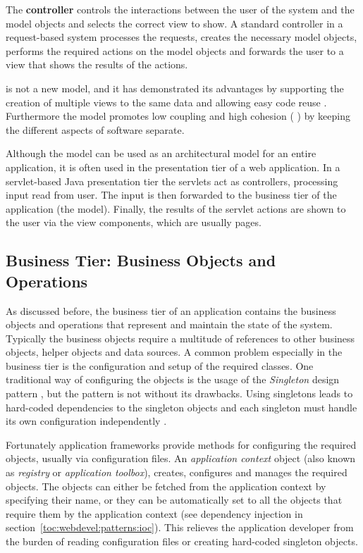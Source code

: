 The \textbf{controller} controls the interactions between the user of 
the system and the model objects and selects the correct view to show. 
A standard controller in a request-based system processes the 
requests, creates the necessary model objects, performs the required 
actions on the model objects and forwards the user to a view that 
shows the results of the actions.

 is not a new model, and it has demonstrated its 
advantages by supporting the creation of multiple views to the same 
data and allowing easy code reuse \citep{dbwebmvc}. Furthermore the 
model promotes low coupling and high cohesion ( 
\citep{applying}) by keeping the different aspects of software 
separate.

Although the  model can be used as an architectural model 
for an entire application, it is often used in the presentation tier 
of a web application. In a servlet-based Java presentation tier the 
servlets act as controllers, processing input read from user. The 
input is then forwarded to the business tier of the application (the 
model). Finally, the results of the servlet actions are shown to the 
user via the view components, which are usually  pages.


\subsection{Business Tier: Business Objects and Operations}
\label{toc:webdevel:threetier:middle}

As discussed before, the business tier of an application contains the 
business objects and operations that represent and maintain the state 
of the system. Typically the business objects require a multitude of 
references to other business objects, helper objects and data sources. 
A common problem especially in the business tier is the configuration 
and setup of the required classes. One traditional way of configuring 
the objects is the usage of the \textsl{Singleton} design pattern 
\citep{applying}, but the pattern is not without its drawbacks. Using 
singletons leads to hard-coded dependencies to the singleton objects
and each singleton must handle its own configuration independently 
\citep{j2eednd}. 

Fortunately application frameworks provide methods for configuring the 
required objects, usually via  configuration files. An
\textsl{application context} object (also known as \textsl{registry} 
or \textsl{application toolbox}), creates, configures and manages the 
required objects. The objects can either be fetched from the 
application context by specifying their name, or they can be 
automatically set to all the objects that require them by the 
application context (see dependency injection in 
section~\ref{toc:webdevel:patterns:ioc}). This relieves the 
application developer from the burden of reading configuration files 
or creating hard-coded singleton objects.

